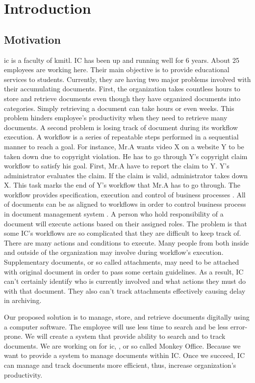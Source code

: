\chapter{Introduction}

\section{Motivation}
\gls{ic} is a faculty of \gls{kmitl}. 
IC has been up and running well for 6 years.
About 25 employees are working here.
Their main objective is to provide educational services to students. 
Currently, they are having two major problems involved with their accumulating documents.
First, the organization takes countless hours to store and retrieve documents even though they have organized documents into categories.
Simply retrieving a document can take hours or even weeks. 
This problem hinders employee's productivity when they need to retrieve many documents. 
A second problem is losing track of document during its workflow execution. 
A workflow is a series of repeatable steps performed in a sequential manner to reach a goal.
For instance, Mr.A wants video X on a website Y to be taken down due to copyright violation.
He has to go through Y's copyright claim workflow to satisfy his goal.
First, Mr.A have to report the claim to Y.
Y's administrator evaluates the claim.
If the claim is valid, administrator takes down X.
This task marks the end of Y's workflow that Mr.A has to go through.
The workflow provides specification, execution and control of business processes \cite{Jablonski:1996:WMM}. 
All of documents can be as aligned to workflows in order to control business process in document management system \cite{DBLP:journals/corr/AsiliT14}.
A person who hold responsibility of a document will execute actions based on their assigned roles.
The problem is that some IC's workflows are so complicated that they are difficult to keep track of.
There are many actions and conditions to execute.
Many people from both inside and outside of the organization may involve during workflow's execution.
Supplementary documents, or so called attachments, may need to be attached with original document in order to pass some certain guidelines.
As a result, IC can't certainly identify who is currently involved and what actions they must do with that document.
They also can't track attachments effectively causing delay in archiving.

Our proposed solution is to manage, store, and retrieve documents digitally using a computer software.
The employee will use less time to search and be less error-prone.
We will create a system that provide ability to search and to track documents.
We are working on \MakeLowercase{\projTitle} for \gls{ic}, \kmitl, or so called Monkey Office.
Because we want to provide a system to manage documents within IC.
Once we succeed, IC can manage and track documents more efficient, thus, increase organization's productivity.

